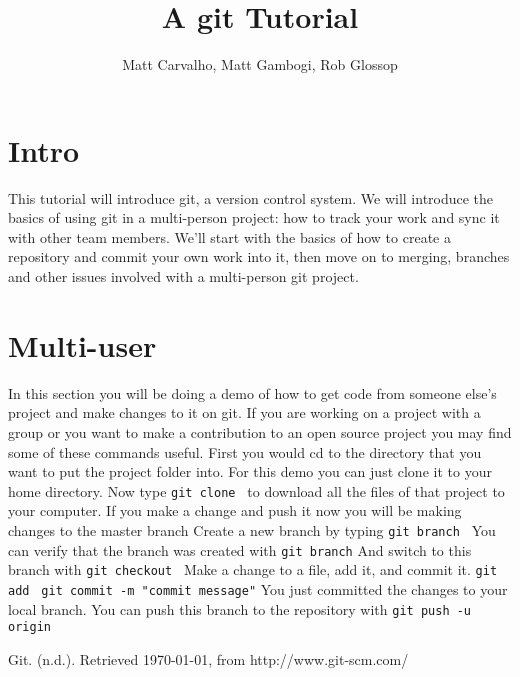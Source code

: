\documentclass[11pt]{report}
\title{A git Tutorial}
\author{Matt Carvalho, Matt Gambogi, Rob Glossop}
\begin{document}
\thispagestyle{empty}
\maketitle

\clearpage {} 

\tableofcontents

\listoffigures

\clearpage {}
\section{Intro}
This tutorial will introduce git, a version control system. We will
introduce the basics of using git in a multi-person project: how to
track your work and sync it with other team members. We'll start with
the basics of how to create a repository and commit your own work into
it, then move on to merging, branches and other issues involved with a
multi-person git project.

\section{Multi-user}
In this section you will be doing a demo of how to get code from someone else's project and make changes to it on git. If you are working on a project with a group or you want to make a contribution to an open source project you may find some of these commands useful.
First you would cd to the directory that you want to put the project folder into.
For this demo you can just clone it to your home directory.
Now type \texttt{git clone } to download all the files of that project to your computer.
If you make a change and push it now you will be making changes to the master branch
Create a new branch by typing \texttt{git branch }
You can verify that the branch was created with \texttt{git branch}
And switch to this branch with \texttt{git checkout }
Make a change to a file, add it, and commit it.
\texttt{git add }
\texttt{git commit -m "commit message"}
You just committed the changes to your local branch.
You can push this branch to the repository with \texttt{git push -u origin }



\begin{thebibliography}{9}

    Git. (n.d.). Retrieved \today, from http://www.git-scm.com/

\end{thebibliography}
\end{document}
